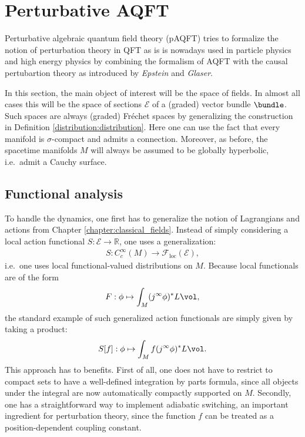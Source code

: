 \section{Perturbative AQFT}

    Perturbative algebraic quantum field theory (pAQFT) tries to formalize the notion of perturbation theory in QFT as is is nowadays used in particle physics and high energy physics by combining the formalism of AQFT with the causal pertubartion theory as introduced by \textit{Epstein} and \textit{Glaser}.

    In this section, the main object of interest will be the space of fields. In almost all cases this will be the space of sections $\mathcal{E}$ of a (graded) vector bundle $\bundle$. Such spaces are always (graded) Fr\'echet spaces by generalizing the construction in Definition \ref{distribution:distribution}. Here one can use the fact that every manifold is $\sigma$-compact and admits a connection. Moreover, as before, the spacetime manifolds $M$ will always be assumed to be globally hyperbolic, i.e.~admit a Cauchy surface.

\subsection{Functional analysis}

    To handle the dynamics, one first has to generalize the notion of Lagrangians and actions from Chapter \ref{chapter:classical_fields}. Instead of simply considering a local action functional $S:\mathcal{E}\rightarrow\mathbb{R}$, one uses a generalization:
    \begin{gather}
        S:C^\infty_c(M)\rightarrow\mathcal{F}_\mathrm{loc}(\mathcal{E}),
    \end{gather}
    i.e.~one uses local functional-valued distributions on $M$. Because local functionals are of the form
    \begin{gather}
        F:\phi\mapsto\int_M (j^\infty\phi)^*L\vol,
    \end{gather}
    the standard example of such generalized action functionals are simply given by taking a product:
    \begin{gather}
        S[f]:\phi\mapsto\int_Mf(j^\infty\phi)^*L\vol.
    \end{gather}
    This approach has to benefits. First of all, one does not have to restrict to compact sets to have a well-defined integration by parts formula, since all objects under the integral are now automatically compactly supported on $M$. Secondly, one has a straightforward way to implement adiabatic switching, an important ingredient for perturbation theory, since the function $f$ can be treated as a position-dependent coupling constant.

